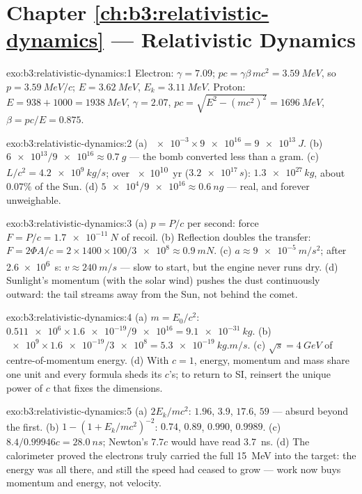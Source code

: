 \section*{Chapter \ref{ch:b3:relativistic-dynamics} --- Relativistic Dynamics}

\begin{solution}{exo:b3:relativistic-dynamics:1}
Electron: $\gamma = 7.09$; $pc = \gamma\beta\,mc^2 = \qty{3.59}{MeV}$,
so $p = \qty{3.59}{MeV}/c$; $E = \qty{3.62}{MeV}$, $E_k =
\qty{3.11}{MeV}$. Proton: $E = 938 + 1000 = \qty{1938}{MeV}$, $\gamma
= 2.07$, $pc = \sqrt{E^2 - (mc^2)^2} = \qty{1696}{MeV}$, $\beta =
pc/E = 0.875$.
\end{solution}

\begin{solution}{exo:b3:relativistic-dynamics:2}
(a) $\num{e-3} \times \num{9e16} = \qty{9e13}{J}$. (b) $\num{6e13}/
\num{9e16} \approx \qty{0.7}{g}$ --- the bomb converted less than a
gram. (c) $L/c^2 = \qty{4.2e9}{kg/s}$; over \qty{e10}{yr}
($\num{3.2e17}{}\,\unit{s}$): $\num{1.3e27}{}\,\unit{kg}$, about
$0.07\%$ of the Sun. (d) $\num{5e4}/\num{9e16} \approx
\qty{0.6}{ng}$ --- real, and forever unweighable.
\end{solution}

\begin{solution}{exo:b3:relativistic-dynamics:3}
(a) $p = P/c$ per second: force $F = P/c = \qty{1.7e-11}{N}$ of
recoil. (b) Reflection doubles the transfer: $F = 2\Phi A/c =
2 \times 1400 \times 100/\num{3e8} \approx \qty{0.9}{mN}$. (c) $a
\approx \qty{9e-5}{m/s^2}$; after \qty{2.6e6}{s}: $v \approx
\qty{240}{m/s}$ --- slow to start, but the engine never runs dry. (d)
Sunlight's momentum (with the solar wind) pushes the dust
continuously outward: the tail streams away from the Sun, not behind
the comet.
\end{solution}

\begin{solution}{exo:b3:relativistic-dynamics:4}
(a) $m = E_0/c^2$: $\num{0.511e6} \times \num{1.6e-19}/\num{9e16} =
\qty{9.1e-31}{kg}$. (b) $\num{e9} \times \num{1.6e-19}/\num{3e8} =
\qty{5.3e-19}{kg.m/s}$. (c) $\sqrt s = \qty{4}{GeV}$ of
centre-of-momentum energy. (d) With $c = 1$, energy, momentum and
mass share one unit and every formula sheds its $c$'s; to return to
SI, reinsert the unique power of $c$ that fixes the dimensions.
\end{solution}

\begin{solution}{exo:b3:relativistic-dynamics:5}
(a) $2E_k/mc^2$: $1.96$, $3.9$, $17.6$, $59$ --- absurd beyond the
first. (b) $1 - (1 + E_k/mc^2)^{-2}$: $0.74$, $0.89$, $0.990$,
$0.9989$. (c) $8.4/0.99946c = \qty{28.0}{ns}$; Newton's $7.7c$ would
have read \qty{3.7}{ns}. (d) The calorimeter proved the electrons
truly carried the full \qty{15}{MeV} into the target: the energy was
all there, and still the speed had ceased to grow --- work now buys
momentum and energy, not velocity.
\end{solution}


